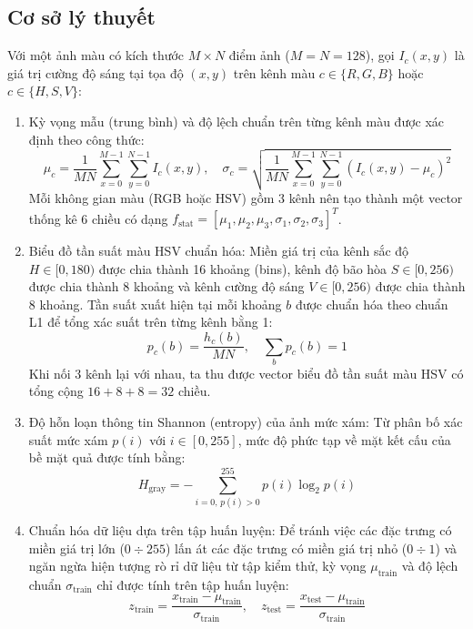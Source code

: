 \documentclass[12pt,a4paper]{article}
\begin{document}
\subsection{Cơ sở lý thuyết}
Với một ảnh màu có kích thước $M \times N$ điểm ảnh ($M = N = 128$), gọi $I_c(x, y)$ là giá trị cường độ sáng tại tọa độ $(x, y)$ trên kênh màu $c \in \{R, G, B\}$ hoặc $c \in \{H, S, V\}$:
\begin{enumerate}
    \item Kỳ vọng mẫu (trung bình) và độ lệch chuẩn trên từng kênh màu được xác định theo công thức:
    \begin{equation}
        \mu_c = \frac{1}{M N} \sum_{x=0}^{M-1} \sum_{y=0}^{N-1} I_c(x, y), \quad
        \sigma_c = \sqrt{\frac{1}{M N} \sum_{x=0}^{M-1} \sum_{y=0}^{N-1} \left(I_c(x, y) - \mu_c\right)^2}
    \end{equation}
    Mỗi không gian màu (RGB hoặc HSV) gồm 3 kênh nên tạo thành một vector thống kê 6 chiều có dạng $f_{\text{stat}} = [\mu_1, \mu_2, \mu_3, \sigma_1, \sigma_2, \sigma_3]^T$.
    \item Biểu đồ tần suất màu HSV chuẩn hóa: Miền giá trị của kênh sắc độ $H \in [0, 180)$ được chia thành 16 khoảng (bins), kênh độ bão hòa $S \in [0, 256)$ được chia thành 8 khoảng và kênh cường độ sáng $V \in [0, 256)$ được chia thành 8 khoảng. Tần suất xuất hiện tại mỗi khoảng $b$ được chuẩn hóa theo chuẩn L1 để tổng xác suất trên từng kênh bằng 1:
    \begin{equation}
        p_c(b) = \frac{h_c(b)}{M N}, \quad \sum_{b} p_c(b) = 1
    \end{equation}
    Khi nối 3 kênh lại với nhau, ta thu được vector biểu đồ tần suất màu HSV có tổng cộng $16 + 8 + 8 = 32$ chiều.
    \item Độ hỗn loạn thông tin Shannon (entropy) của ảnh mức xám: Từ phân bố xác suất mức xám $p(i)$ với $i \in [0, 255]$, mức độ phức tạp về mặt kết cấu của bề mặt quả được tính bằng:
    \begin{equation}
        H_{\text{gray}} = -\sum_{i=0, \, p(i) > 0}^{255} p(i) \log_2 p(i)
    \end{equation}
    \item Chuẩn hóa dữ liệu dựa trên tập huấn luyện: Để tránh việc các đặc trưng có miền giá trị lớn ($0 \div 255$) lấn át các đặc trưng có miền giá trị nhỏ ($0 \div 1$) và ngăn ngừa hiện tượng rò rỉ dữ liệu từ tập kiểm thử, kỳ vọng $\mu_{\text{train}}$ và độ lệch chuẩn $\sigma_{\text{train}}$ chỉ được tính trên tập huấn luyện:
    \begin{equation}
        z_{\text{train}} = \frac{x_{\text{train}} - \mu_{\text{train}}}{\sigma_{\text{train}}}, \quad
        z_{\text{test}} = \frac{x_{\text{test}} - \mu_{\text{train}}}{\sigma_{\text{train}}}
    \end{equation}
\end{enumerate}
\end{document}
